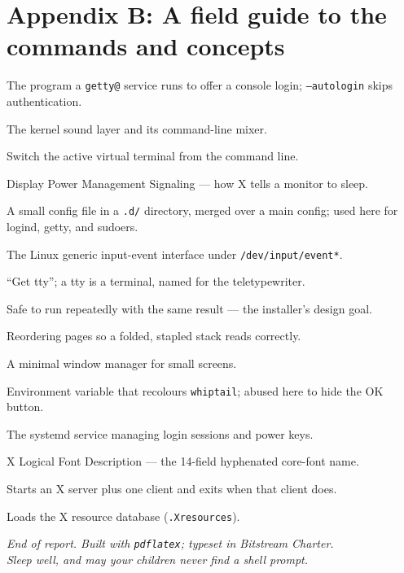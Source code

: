 \documentclass[11pt,oneside]{article}
\newcommand{\code}[1]{\texorpdfstring{\textcolor{kbblue}{\texttt{#1}}}{#1}}
\newcommand{\file}[1]{\textcolor{kbteal}{\texttt{#1}}}
\begin{document}
\section*{Appendix B: A field guide to the commands and concepts}

\begin{description}[style=nextline,leftmargin=0pt,font=\ttfamily\color{kbblue}]
\item[agetty] The program a \texttt{getty@} service runs to offer a console
login; \code{--autologin} skips authentication.
\item[ALSA / amixer] The kernel sound layer and its command-line mixer.
\item[chvt] Switch the active virtual terminal from the command line.
\item[DPMS] Display Power Management Signaling --- how X tells a monitor to sleep.
\item[drop-in] A small config file in a \texttt{.d/} directory, merged over a
main config; used here for logind, getty, and sudoers.
\item[evdev] The Linux generic input-event interface under
\file{/dev/input/event*}.
\item[getty / tty] ``Get tty''; a tty is a terminal, named for the
teletypewriter.
\item[idempotent] Safe to run repeatedly with the same result --- the installer's
design goal.
\item[imposition] Reordering pages so a folded, stapled stack reads correctly.
\item[matchbox] A minimal window manager for small screens.
\item[NEWT\_COLORS] Environment variable that recolours \texttt{whiptail};
abused here to hide the OK button.
\item[systemd-logind] The systemd service managing login sessions and power keys.
\item[XLFD] X Logical Font Description --- the 14-field hyphenated core-font name.
\item[xinit] Starts an X server plus one client and exits when that client does.
\item[xrdb] Loads the X resource database (\file{.Xresources}).
\end{description}

\vfill
\begin{center}
\small\itshape\color{kbgrey}
End of report. Built with \texttt{pdflatex}; typeset in Bitstream Charter.\\
Sleep well, and may your children never find a shell prompt.
\end{center}
\end{document}
